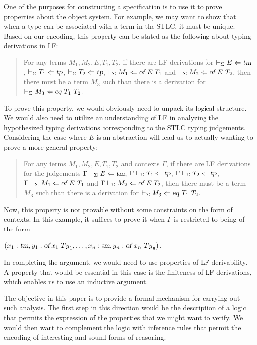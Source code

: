 One of the purposes for constructing a specification is to use it to
prove properties about the object system.
%
For example, we may want to show that when a type can be associated
with a term in the STLC, it must be unique.
%
Based on our encoding, this property can be stated as the following
about typing derivations in LF:
\begin{quotation}
\noindent For any terms $M_1,M_2,E,T_1,T_2$, if there are LF
derivations for
$\vdash_{\Sigma} E\Leftarrow \mbox{\sl tm}$, $\vdash_{\Sigma} T_1\Leftarrow \mbox{\sl tp}$,
$\vdash_{\Sigma} T_2\Leftarrow \mbox{\sl tp}$,
$\vdash_{\Sigma} M_1\Leftarrow \mbox{\sl of}\  E\  T_1$ and
$\vdash_{\Sigma} M_2\Leftarrow \mbox{\sl of}\  E\  T_2$, then there must be a term
$M_3$ such than there is a derivation for
$\vdash_{\Sigma} M_3\Leftarrow \mbox{\sl eq}\  T_1\  T_2$. 
\end{quotation}
To prove this property, we would obviously need to unpack its logical
structure.
%
We would also need to utilize an understanding of LF in
analyzing the hypothesized typing derivations corresponding to the
STLC typing judgements. 
%
Considering the case where $E$ is an abstraction will lead us to actually
wanting to prove a more general property:
\begin{quotation}
\noindent For any terms $M_1,M_2,E,T_1,T_2$ and contexts $\Gamma$, if
there are LF derivations for the judgements
$\Gamma \vdash_{\Sigma} E\Leftarrow \mbox{\sl tm}$, $\Gamma \vdash_{\Sigma} T_1\Leftarrow \mbox{\sl tp}$,
$\Gamma \vdash_{\Sigma} T_2\Leftarrow \mbox{\sl tp}$,
$\Gamma \vdash_{\Sigma} M_1\Leftarrow \mbox{\sl of}\  E\  T_1$ and
$\Gamma \vdash_{\Sigma} M_2\Leftarrow \mbox{\sl of}\  E\  T_2$, 
then there must be a term $M_3$ such than there is a derivation
for $\vdash_{\Sigma} M_3\Leftarrow \mbox{\sl eq}\  T_1\  T_2$. 
\end{quotation}
Now, this property is not provable without some constraints on the form
of contexts.
%
In this example, it suffices to prove it when $\Gamma$ is restricted
to being of the form
\begin{center}
 $(x_1:\mbox{\sl tm},y_1:\mbox{\sl of}\  x_1\ {Ty}_1,\ldots,x_n:\mbox{\sl tm},y_n:\mbox{\sl of}\  x_n\ {Ty}_n)$.
\end{center}
%
\noindent In completing the argument, we would need to use properties of LF
derivability.
%
A property that would be essential in this case is the finiteness of
LF derivations, which enables us to use an inductive argument.

The objective in this paper is to provide a formal mechanism for
carrying out such analysis.
%
The first step in this direction would be the description of a logic
that permits the expression of the properties that we might want to
verify. 
%
We would then want to complement the logic with inference rules that 
permit the encoding of interesting and sound forms of reasoning. 


